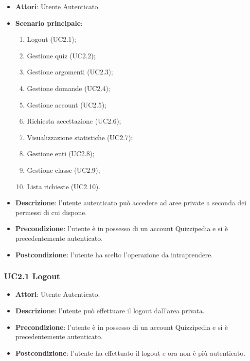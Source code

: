 \begin{itemize}
\item \textbf{Attori}: Utente Autenticato.
\item \textbf{Scenario principale}:
\begin{enumerate}
\item Logout (UC2.1);
\item Gestione quiz (UC2.2);
\item Gestione argomenti (UC2.3);
\item Gestione domande (UC2.4);
\item Gestione account (UC2.5);
\item Richiesta accettazione (UC2.6);
\item Visualizzazione statistiche (UC2.7);
\item Gestione enti (UC2.8);
\item Gestione classe (UC2.9);
\item Lista richieste (UC2.10).
\end{enumerate}
\item \textbf{Descrizione}: l'utente autenticato può accedere ad aree private a seconda dei permessi di cui dispone.
\item \textbf{Precondizione}: l'utente è in possesso di un account Quizzipedia e si è precedentemente autenticato.
\item \textbf{Postcondizione}: l'utente ha scelto l'operazione da intraprendere.
\end{itemize}
\subsubsection{UC2.1 Logout}
\begin{itemize}
\item \textbf{Attori}: Utente Autenticato.
\item \textbf{Descrizione}: l'utente può effettuare il logout dall'area privata.
\item \textbf{Precondizione}: l'utente è in possesso di un account Quizzipedia e si è precedentemente autenticato.
\item \textbf{Postcondizione}: l'utente ha effettuato il logout e ora non è più autenticato.
\end{itemize}
